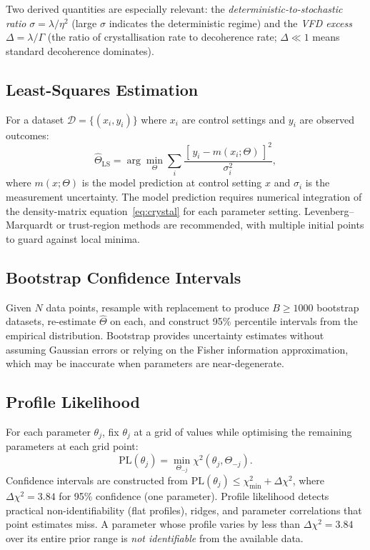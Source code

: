 \documentclass[12pt]{article}
\begin{document}
Two derived quantities are especially relevant: the \emph{deterministic-to-stochastic ratio} $\sigma = \lambda / \eta^2$ (large $\sigma$ indicates the deterministic regime) and the \emph{VFD excess} $\Delta = \lambda / \Gamma$ (the ratio of crystallisation rate to decoherence rate; $\Delta \ll 1$ means standard decoherence dominates).

\subsection{Least-Squares Estimation}

For a dataset $\mathcal{D} = \{(x_i, y_i)\}$ where $x_i$ are control settings and $y_i$ are observed outcomes:
\begin{equation}
\hat{\Theta}_{\mathrm{LS}} = \arg\min_\Theta \sum_i \frac{\left[\, y_i - m(x_i; \Theta)\,\right]^2}{\sigma_i^2},
\end{equation}
where $m(x; \Theta)$ is the model prediction at control setting $x$ and $\sigma_i$ is the measurement uncertainty. The model prediction requires numerical integration of the density-matrix equation~\eqref{eq:crystal} for each parameter setting. Levenberg--Marquardt or trust-region methods are recommended, with multiple initial points to guard against local minima.

\subsection{Bootstrap Confidence Intervals}

Given $N$ data points, resample with replacement to produce $B \geq 1000$ bootstrap datasets, re-estimate $\hat{\Theta}$ on each, and construct 95\% percentile intervals from the empirical distribution. Bootstrap provides uncertainty estimates without assuming Gaussian errors or relying on the Fisher information approximation, which may be inaccurate when parameters are near-degenerate.

\subsection{Profile Likelihood}

For each parameter $\theta_j$, fix $\theta_j$ at a grid of values while optimising the remaining parameters at each grid point:
\begin{equation}
\mathrm{PL}(\theta_j) = \min_{\Theta_{-j}} \chi^2(\theta_j, \Theta_{-j}).
\end{equation}
Confidence intervals are constructed from $\mathrm{PL}(\theta_j) \leq \chi^2_{\min} + \Delta\chi^2$, where $\Delta\chi^2 = 3.84$ for 95\% confidence (one parameter). Profile likelihood detects practical non-identifiability (flat profiles), ridges, and parameter correlations that point estimates miss. A parameter whose profile varies by less than $\Delta\chi^2 = 3.84$ over its entire prior range is \emph{not identifiable} from the available data.
\end{document}
